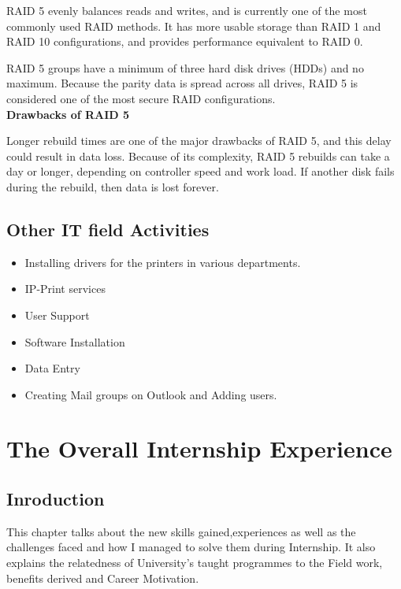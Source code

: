 \documentclass{article}
\begin{document}
\par RAID 5 evenly balances reads and writes, and is currently one of the most commonly used RAID methods. It has more usable storage than RAID 1 and RAID 10 configurations, and provides performance equivalent to RAID 0.
\par RAID 5 groups have a minimum of three hard disk drives (HDDs) and no maximum. Because the parity data is spread across all drives, RAID 5 is considered one of the most secure RAID configurations.\\
\textbf{Drawbacks of RAID 5} \cite{chen1996performance}
\par Longer rebuild times are one of the major drawbacks of RAID 5, and this delay could result in data loss. Because of its complexity, RAID 5 rebuilds can take a day or longer, depending on controller speed and work load. If another disk fails during the rebuild, then data is lost forever.
\subsection{Other IT field Activities}
\begin{itemize}
\item Installing drivers for the printers in various departments.
\item IP-Print services
\item User Support
\item Software Installation
\item Data Entry
\item Creating Mail groups on Outlook and Adding users.
\end{itemize}
\newpage
\section{The Overall Internship Experience}
\subsection{Inroduction}
This chapter talks about the  new skills gained,experiences as well as the challenges faced and how I managed to solve them during Internship. It also explains the relatedness of University's taught programmes to the Field work, benefits derived and Career Motivation.
\end{document}
